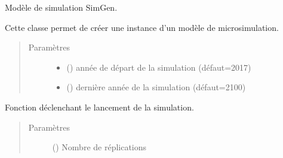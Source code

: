 \documentclass[letterpaper,10pt,french]{sphinxmanual}
\begin{document}
\begin{fulllineitems}
\label{\detokenize{utilisation:id6}}
Modèle de simulation SimGen.

Cette classe permet de créer une instance d’un modèle de microsimulation.
\begin{quote}\begin{description}
\item[{Paramètres}] \leavevmode\begin{itemize}
\item {} 
 () \textendash{} année de départ de la simulation (défaut=2017)

\item {} 
 () \textendash{} dernière année de la simulation (défaut=2100)

\end{itemize}

\end{description}\end{quote}

\begin{fulllineitems}
\label{\detokenize{utilisation:simgen.model.simulate}}
Fonction déclenchant le lancement de la simulation.
\begin{quote}\begin{description}
\item[{Paramètres}] \leavevmode
{} () \textendash{} Nombre de réplications

\end{description}\end{quote}

\end{fulllineitems}


\end{fulllineitems}
\end{document}
